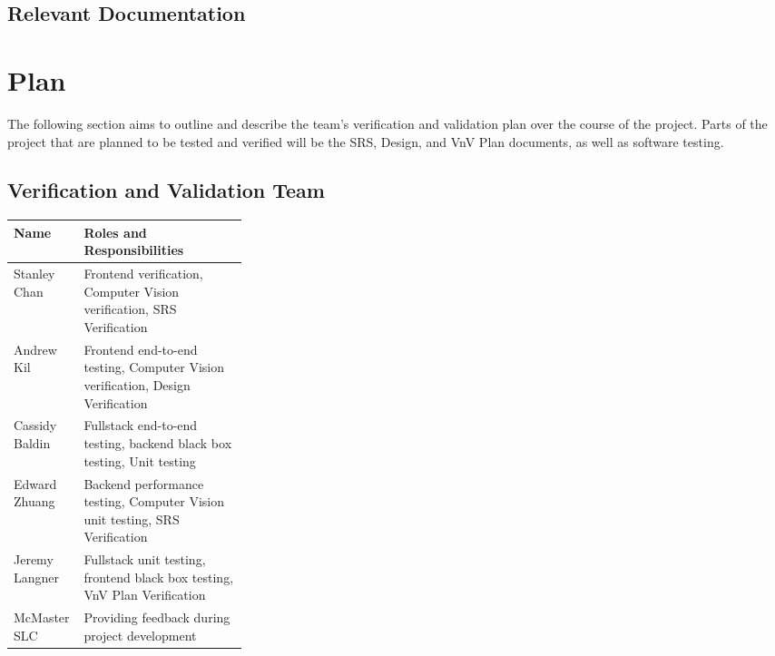 \documentclass[12pt, titlepage]{article}
\begin{document}

\subsection{Relevant Documentation}


\citet{SRS}


\section{Plan}

The following section aims to outline and describe the team's verification and validation plan over the course of the project. Parts of
the project that are planned to be tested and verified will be the SRS, Design, and VnV Plan documents, as well as software testing.

\subsection{Verification and Validation Team}

\begin{tabularx}{\textwidth}{p{0.3\linewidth} | X}
  \toprule
  Name & Roles and Responsibilities \\
  \hline
  Stanley Chan & Frontend verification, Computer Vision verification, SRS Verification \\
  Andrew Kil & Frontend end-to-end testing, Computer Vision verification, Design Verification \\
  Cassidy Baldin & Fullstack end-to-end testing, backend black box testing, Unit testing \\
  Edward Zhuang & Backend performance testing, Computer Vision unit testing, SRS Verification \\
  Jeremy Langner & Fullstack unit testing, frontend black box testing, VnV Plan Verification \\
  McMaster SLC & Providing feedback during project development \\
  \bottomrule
\end{tabularx}
\end{document}

